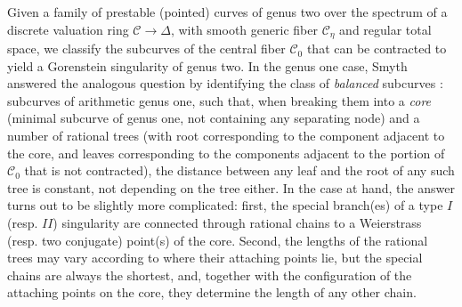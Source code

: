 \documentclass[11pt]{amsart}
\renewcommand{\to}{\rightarrow}
\newcommand{\dvr}{\Delta}
\theoremstyle{plain}
\theoremstyle{definition}
\begin{document}
Given a family of prestable (pointed) curves of genus two over the spectrum of a discrete valuation ring $\mathcal C\to\dvr$, with smooth generic fiber $\mathcal C_{\eta}$ and regular total space, we classify the subcurves of the central fiber $\mathcal C_{0}$ that can be contracted to yield a Gorenstein singularity of genus two. In the genus one case, Smyth answered the analogous question by identifying the class of \emph{balanced} subcurves \cite[Definition 2.11]{SMY1}: subcurves of arithmetic genus one, such that, when breaking them into a \emph{core} (minimal subcurve of genus one, not containing any separating node) and a number of rational trees (with root corresponding to the component adjacent to the core, and leaves corresponding to the components adjacent to the portion of $\mathcal C_0$ that is not contracted), the distance between any leaf and the root of any such tree is constant, not depending on the tree either. In the case at hand, the answer turns out to be slightly more complicated: first, the special branch(es) of a type $I$ (resp. $I\!I$) singularity are connected through rational chains to a Weierstrass (resp. two conjugate) point(s) of the core. Second, the lengths of the rational trees may vary according to where their attaching points lie, but the special chains are always the shortest, and, together with the configuration of the attaching points on the core, they determine the length of any other chain.
\end{document}
